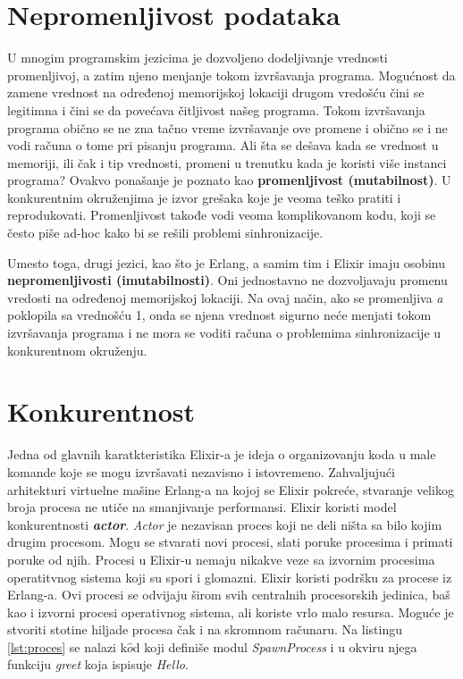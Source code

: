 \documentclass[12pt,oneside]{memoir}
\begin{document}


\section{Nepromenljivost podataka}
\label{odeljak:nepromenljivostPodataka}

U mnogim programskim jezicima je dozvoljeno dodeljivanje vrednosti promenljivoj, a zatim njeno menjanje tokom izvršavanja programa. Mogućnost da zamene vrednost na određenoj memorijskoj lokaciji drugom vredošću čini se legitimna i čini se da povećava čitljivost našeg programa. Tokom izvršavanja programa obično se ne zna tačno vreme izvršavanje ove promene i obično se i ne vodi računa o tome pri pisanju programa. Ali šta se dešava kada se vrednost u memoriji, ili čak i tip vrednosti, promeni u trenutku kada je koristi više instanci programa?  Ovakvo ponašanje je poznato kao \textbf{promenljivost (mutabilnost)}. U konkurentnim okruženjima je izvor grešaka koje je veoma teško pratiti i reprodukovati. Promenljivost takođe vodi veoma komplikovanom kodu, koji se često piše ad-hoc kako bi se rešili problemi sinhronizacije.

Umesto toga, drugi jezici, kao što je Erlang, a samim tim i Elixir imaju osobinu \textbf{nepromenljivosti (imutabilnosti)}. Oni jednostavno ne dozvoljavaju promenu vredosti na određenoj memorijskoj lokaciji. Na ovaj način, ako se promenljiva \textit{a} poklopila sa vrednošću 1, onda se njena vrednost sigurno neće menjati tokom izvršavanja programa i ne mora se voditi računa o problemima sinhronizacije u konkurentnom okruženju.

\section{Konkurentnost}

Jedna od glavnih karatkteristika Elixir-a je ideja o organizovanju koda u male komande koje se mogu izvršavati nezavisno i istovremeno. Zahvaljujući arhitekturi virtuelne mašine Erlang-a na kojoj se Elixir pokreće, stvaranje velikog broja procesa ne utiče na smanjivanje performansi. Elixir koristi model konkurentnosti \textit{\textbf{actor}}. \textit{Actor} je nezavisan proces koji ne deli ništa sa bilo kojim drugim procesom. Mogu se stvarati novi procesi, slati poruke procesima i primati poruke od njih. Procesi u Elixir-u nemaju nikakve veze sa izvornim procesima operatitvnog sistema koji su spori i glomazni. Elixir koristi podršku za procese iz Erlang-a. Ovi procesi se odvijaju širom svih centralnih procesorskih jedinica, baš kao i izvorni procesi operativnog sistema, ali koriste vrlo malo resursa. Moguće je stvoriti stotine hiljade procesa čak i na skromnom računaru. Na listingu \ref{lst:proces} se nalazi k$\hat{o}$d koji definiše modul \textit{SpawnProcess} i u okviru njega funkciju \textit{greet} koja ispisuje \textit{Hello}.
\end{document}
